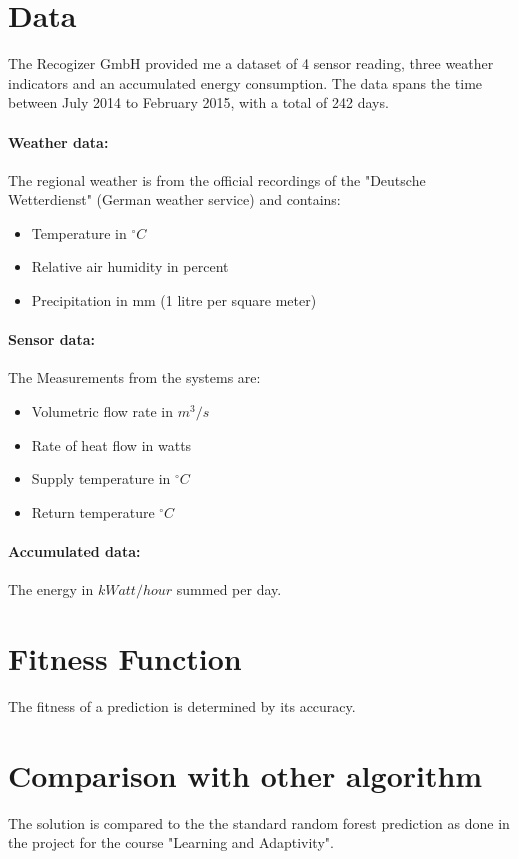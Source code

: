 \documentclass{scrartcl}
\begin{document}
\section{Data}
The Recogizer GmbH provided me a dataset of 4 sensor reading, three weather indicators and an accumulated energy consumption. The data spans the time between July 2014 to February 2015, with a total of 242 days.

\paragraph{Weather data:}
The regional weather is from the official recordings of the "Deutsche Wetterdienst" (German weather service) and contains:

\begin{itemize}
\item Temperature in $^\circ C$
\item Relative air humidity in percent
\item Precipitation in mm (1 litre per square meter)
\end{itemize}

\paragraph{Sensor data:}
The Measurements from the systems are:

\begin{itemize}
\item Volumetric flow rate in $m^3 / s$
\item Rate of heat flow in watts
\item Supply temperature in $^\circ C$
\item Return temperature $^\circ C$
\end{itemize}

\paragraph{Accumulated data:}
The energy in $k Watt/hour$ summed per day.

\section{Fitness Function}
The fitness of a prediction is determined by its accuracy.

\section{Comparison with other algorithm}
The solution is compared to the the standard random forest prediction as done in the project for the course "Learning and Adaptivity".
\end{document}
